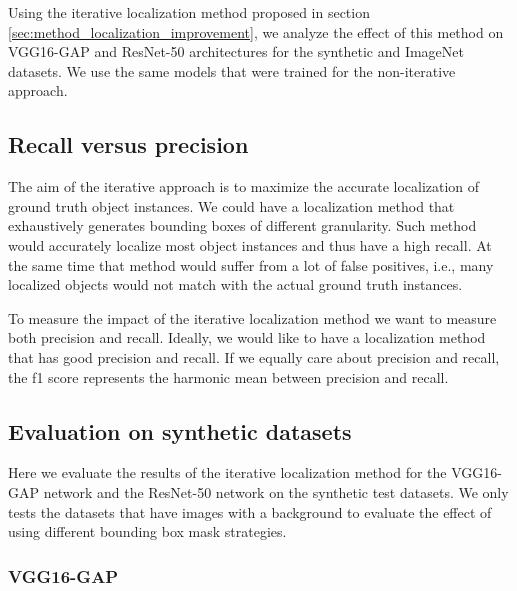 Using the iterative localization method proposed in section \ref{sec:method_localization_improvement}, we analyze the effect of this method on VGG16-GAP and ResNet-50 architectures for the synthetic and ImageNet datasets. We use the same models that were trained for the non-iterative approach.

\subsection{Recall versus precision}
The aim of the iterative approach is to maximize the accurate localization of ground truth object instances. We could have a localization method that exhaustively generates bounding boxes of different granularity. Such method would accurately localize most object instances and thus have a high recall. At the same time that method would suffer from a lot of false positives, i.e., many localized objects would not match with the actual ground truth instances.

To measure the impact of the iterative localization method we want to measure both precision and recall. Ideally, we would like to have a localization method that has good precision and recall. If we equally care about precision and recall, the f1 score represents the harmonic mean between precision and recall.

\subsection{Evaluation on synthetic datasets}
Here we evaluate the results of the iterative localization method for the VGG16-GAP network and the ResNet-50 network on the synthetic test datasets. We only tests the datasets that have images with a background to evaluate the effect of using different bounding box mask strategies.

\subsubsection{VGG16-GAP}


